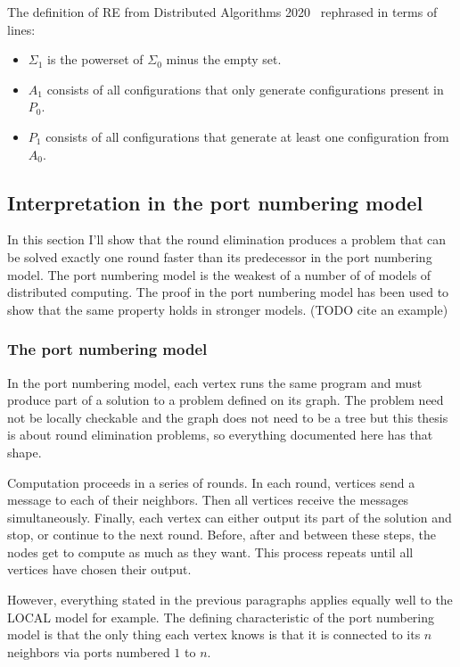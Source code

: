\documentclass[english, 12pt, a4paper, sci, a-1b, online]{aaltothesis}
\begin{document}
The definition of RE from Distributed Algorithms 2020~\cite{DA2020} rephrased in terms of lines:
\begin{itemize}
  \item $\Sigma_1$ is the powerset of $\Sigma_0$ minus the empty set.
  \item $A_{1}$ consists of all configurations that only generate configurations present in $P_{0}$.
  \item $P_1$ consists of all configurations that generate at least one configuration from $A_0$.
\end{itemize}

\subsection{Interpretation in the port numbering model}

In this section I'll show that the round elimination produces a problem that can be solved exactly one round faster than its predecessor in the port numbering model. The port numbering model is the weakest of a number of of models of distributed computing. The proof in the port numbering model has been used to show that the same property holds in stronger models. (TODO cite an example)

\subsubsection{The port numbering model}

In the port numbering model, each vertex runs the same program and must produce part of a solution to a problem defined on its graph. The problem need not be locally checkable and the graph does not need to be a tree but this thesis is about round elimination problems, so everything documented here has that shape.

Computation proceeds in a series of rounds. In each round, vertices send a message to each of their neighbors. Then all vertices receive the messages simultaneously. Finally, each vertex can either output its part of the solution and stop, or continue to the next round. Before, after and between these steps, the nodes get to compute as much as they want. This process repeats until all vertices have chosen their output.

However, everything stated in the previous paragraphs applies equally well to the LOCAL model for example. The defining characteristic of the port numbering model is that the only thing each vertex knows is that it is connected to its $n$ neighbors via ports numbered $1$ to $n$.
\end{document}
